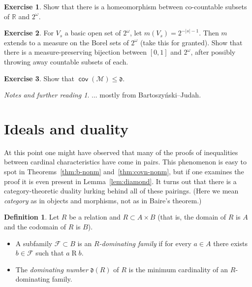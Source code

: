 \documentclass[11pt,oneside,a4paper]{amsbook}
\newcommand{\R}{\mathbb R}
\newcommand{\Meager}{\mathcal M}
\DeclareMathOperator{\cov}{\mathsf{cov}}
\theoremstyle{definition}
\newtheorem{exercise}{Exercise}[section]
\theoremstyle{plain}
\theoremstyle{definition}
\newtheorem{definition}[theorem]{Definition}
\theoremstyle{remark}
\newtheorem*{notes}{Notes and further reading}
\numberwithin{equation}{section}
\numberwithin{figure}{section}
\begin{document}
\begin{exercise}
  \label{exerc:meager-bij}
  Show that there is a homeomorphism between co-countable subsets of $\R$ and $2^\omega$.
\end{exercise}

\begin{exercise}
  \label{exerc:null-bij}
  For $V_s$ a basic open set of $2^\omega$, let $m(V_s)=2^{-|s|-1}$. Then $m$ extends to a measure on the Borel sets of $2^\omega$ (take this for granted). Show that there is a measure-preserving bijection between $[0,1]$ and $2^\omega$, after possibly throwing away countable subsets of each.
\end{exercise}

\begin{exercise}
  \label{exerc:covm-d}
  Show that $\cov(\Meager)\leq\mathfrak d$.
\end{exercise}

\begin{notes}
  ... mostly from Bartoszy\'nski--Judah.
\end{notes}


\newpage
\section{Ideals and duality}

At this point one might have observed that many of the proofs of inequalities between cardinal characteristics have come in pairs. This phenomenon is easy to spot in Theorems~\ref{thm:b-nonm} and~\ref{thm:covn-nonm}, but if one examines the proof it is even present in Lemma~\ref{lem:diamond}. It turns out that there is a category-theoretic duality lurking behind all of these pairings. (Here we mean \emph{category} as in objects and morphisms, not as in Baire's theorem.)

\begin{definition}
  Let $R$ be a relation and $R\subset A\times B$ (that is, the domain of $R$ is $A$ and the codomain of $R$ is $B$).
  \begin{itemize}
  \item A subfamily $\mathcal F\subset B$ is an \emph{$R$-dominating family} if for every $a\in A$ there exists $b\in\mathcal F$ such that $a\mathrel{R}b$.
  \item The \emph{dominating number} $\mathfrak d(R)$ of $R$ is the minimum cardinality of an $R$-dominating family.
  \end{itemize}
\end{definition}
\end{document}
